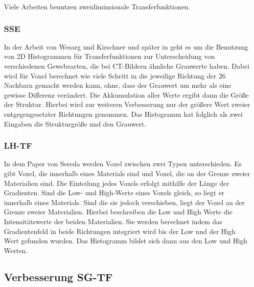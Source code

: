 Viele Arbeiten benutzen zweidiminsionale Transferfunktionen.

\subsubsection{SSE}

In der Arbeit von Wesarg und Kirschner \cite{wesarg2009structure} und später in \cite{wesarg20102d} geht es um die Benutzung von 2D Histogrammen für Transferfunktionen zur Unterscheidung von verschiedenen Gewebearten, die bei CT-Bildern ähnliche Grauwerte haben.
\newline
Dabei wird für Voxel berechnet wie viele Schritt in die jeweilige Richtung der 26 Nachbarn gemacht werden kann, ohne, dass der Grauwert um mehr als eine gewisse Differenz verändert. Die Akkumulation aller Werte ergibt dann die Größe der Struktur. Hierbei wird zur weiteren Verbesserung nur der größere Wert zweier entgegengesetzter Richtungen genommen.
\newline
Das Histogramm hat folglich als zwei Eingaben die Strukturgröße und den Grauwert.


\subsubsection{LH-TF}


In dem Paper von Sereda \cite{sereda2006visualization} werden Voxel zwischen zwei Typen unterschieden. Es gibt Voxel, die  innerhalb eines Materials sind und Voxel, die  an der Grenze zweier Materialien sind. Die Einteilung jedes Voxels erfolgt mithilfe der Länge der Gradienten. Sind die Low- und High-Werte eines Voxels gleich, so liegt er innerhalb eines Materials. Sind  die sie jedoch verschieben, liegt der Voxel an der Grenze zweier Materialien. Hierbei beschreiben die Low und High Werte die Intensitätswerte der beiden Materialien. Sie werden berechnet indem das Gradientenfeld in beide Richtungen integriert wird bis der Low und der High Wert gefunden wurden. 
\newline
Das Histogramm bildet sich dann aus den Low und High Werten.


\subsection{Verbesserung SG-TF}

